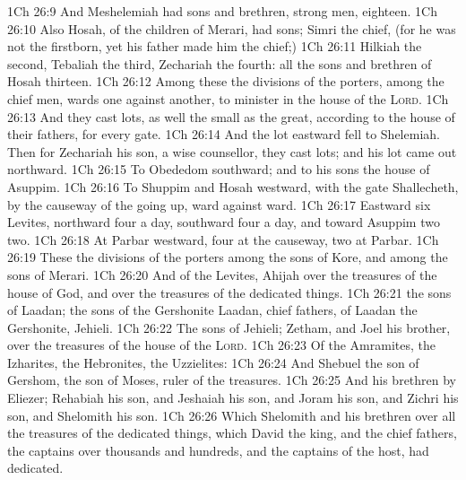 \vs 1Ch 26:9 And Meshelemiah had sons and brethren, strong men, eighteen.
\vs 1Ch 26:10 Also Hosah, of the children of Merari, had sons; Simri the chief, (for  he was not the firstborn, yet his father made him the chief;)
\vs 1Ch 26:11 Hilkiah the second, Tebaliah the third, Zechariah the fourth: all the sons and brethren of Hosah  thirteen.
\vs 1Ch 26:12 Among these  the divisions of the porters,  among the chief men,  wards one against another, to minister in the house of the \textsc{Lord}.
\vs 1Ch 26:13 And they cast lots, as well the small as the great, according to the house of their fathers, for every gate.
\vs 1Ch 26:14 And the lot eastward fell to Shelemiah. Then for Zechariah his son, a wise counsellor, they cast lots; and his lot came out northward.
\vs 1Ch 26:15 To Obededom southward; and to his sons the house of Asuppim.
\vs 1Ch 26:16 To Shuppim and Hosah  westward, with the gate Shallecheth, by the causeway of the going up, ward against ward.
\vs 1Ch 26:17 Eastward  six Levites, northward four a day, southward four a day, and toward Asuppim two  two.
\vs 1Ch 26:18 At Parbar westward, four at the causeway,  two at Parbar.
\vs 1Ch 26:19 These  the divisions of the porters among the sons of Kore, and among the sons of Merari.
\vs 1Ch 26:20 And of the Levites, Ahijah  over the treasures of the house of God, and over the treasures of the dedicated things.
\vs 1Ch 26:21  the sons of Laadan; the sons of the Gershonite Laadan, chief fathers,  of Laadan the Gershonite,  Jehieli.
\vs 1Ch 26:22 The sons of Jehieli; Zetham, and Joel his brother,  over the treasures of the house of the \textsc{Lord}.
\vs 1Ch 26:23 Of the Amramites,  the Izharites, the Hebronites,  the Uzzielites:
\vs 1Ch 26:24 And Shebuel the son of Gershom, the son of Moses,  ruler of the treasures.
\vs 1Ch 26:25 And his brethren by Eliezer; Rehabiah his son, and Jeshaiah his son, and Joram his son, and Zichri his son, and Shelomith his son.
\vs 1Ch 26:26 Which Shelomith and his brethren  over all the treasures of the dedicated things, which David the king, and the chief fathers, the captains over thousands and hundreds, and the captains of the host, had dedicated.
